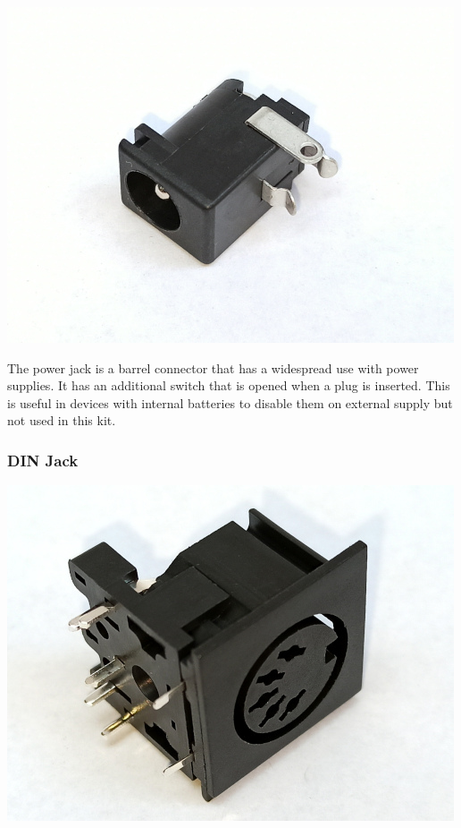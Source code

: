 \documentclass{scrartcl}
\begin{document}
\begin{center}
    \includegraphics[scale=0.5]{assets/zekit-dcjack-resized.jpg}
\end{center}

The power jack is a barrel connector that has a widespread use with power supplies. It has an additional switch that is opened when a plug is inserted. This is useful in devices with internal batteries to disable them on external supply but not used in this kit.

\subsubsection{DIN Jack}

\begin{center}
    \includegraphics[scale=0.5]{assets/zekit-din-resized.jpg}
\end{center}
\end{document}
